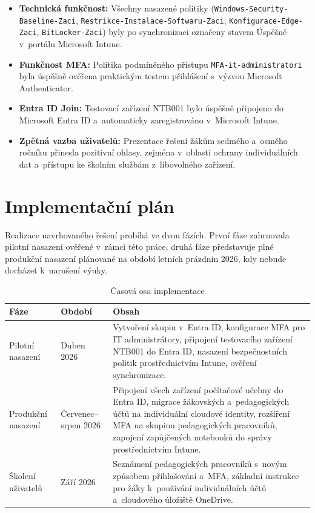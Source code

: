 \documentclass[male,czech,api_bc]{kitheses}
\begin{document}
\begin{itemize}
    \item \textbf{Technická funkčnost:} Všechny nasazené politiky 
    (\texttt{Windows-Security-Baseline-Zaci}, 
    \texttt{Restrikce-\allowbreak Instalace-\allowbreak Softwaru-\allowbreak Zaci}, 
    \texttt{Konfigurace-\allowbreak Edge-\allowbreak Zaci}, 
    \texttt{BitLocker-\allowbreak Zaci}) byly po synchronizaci 
    označeny stavem Úspěšné v~portálu Microsoft Intune.
    \item \textbf{Funkčnost MFA:} Politika podmíněného přístupu 
    \texttt{MFA-it-administratori} byla úspěšně ověřena praktickým 
    testem přihlášení s~výzvou Microsoft Authenticator.
    \item \textbf{Entra ID Join:} Testovací zařízení NTB001 bylo 
    úspěšně připojeno do Microsoft Entra ID a~automaticky 
    zaregistrováno v~Microsoft Intune.
    \item \textbf{Zpětná vazba uživatelů:} Prezentace řešení žákům 
    sedmého a~osmého ročníku přinesla pozitivní ohlasy, zejména 
    v~oblasti ochrany individuálních dat a~přístupu ke školním 
    službám z~libovolného zařízení.
\end{itemize}

\section{Implementační plán}

Realizace navrhovaného řešení probíhá ve dvou fázích. První fáze 
zahrnovala pilotní nasazení ověřené v~rámci této práce, druhá fáze 
představuje plné produkční nasazení plánované na období letních 
prázdnin 2026, kdy nebude docházet k~narušení výuky.

\begin{table}[h]
\centering
\caption{Časová osa implementace}
\label{tab:implementacni-plan}
\begin{tabular}{|p{3cm}|p{3cm}|p{7cm}|}
\hline
\textbf{Fáze} & \textbf{Období} & \textbf{Obsah} \\
\hline
Pilotní nasazení & Duben 2026 & 
Vytvoření skupin v~Entra ID, konfigurace MFA pro IT administrátory, 
připojení testovacího zařízení NTB001 do Entra ID, nasazení 
bezpečnostních politik prostřednictvím Intune, ověření synchronizace. \\
\hline
Produkční nasazení & Červenec--srpen 2026 & 
Připojení všech zařízení počítačové učebny do Entra ID, migrace 
žákovských a~pedagogických účtů na individuální cloudové identity, 
rozšíření MFA na skupinu pedagogických pracovníků, zapojení 
zapůjčených notebooků do správy prostřednictvím Intune. \\
\hline
Školení uživatelů & Září 2026 & 
Seznámení pedagogických pracovníků s~novým způsobem přihlašování 
a~MFA, základní instrukce pro žáky k~používání individuálních účtů 
a~cloudového úložiště OneDrive. \\
\hline
\end{tabular}
\end{table}
\end{document}
